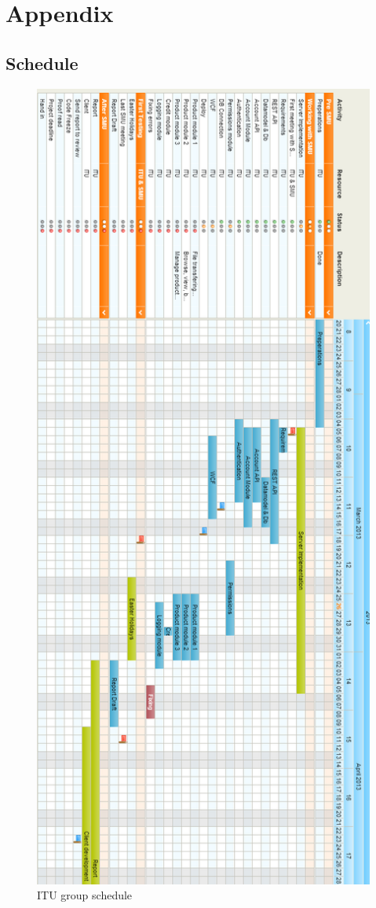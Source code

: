 \section*{Appendix}
\renewcommand*\thesubsection{\Roman{subsection}} %



\subsection{Schedule}
\label{schedule}
\begin{figure}[H]
\includegraphics[scale=0.5]{illustrations/ItuSchedule.png}
\caption{ITU group schedule}
\end{figure}
